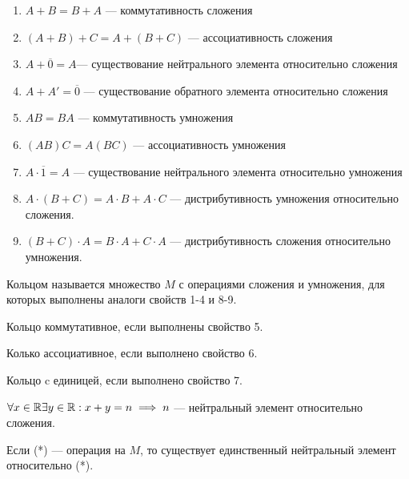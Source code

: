 \begin{normalsize}
\begin{enumerate}
    \item $A + B = B + A$ --- коммутативность сложения
    \item $(A + B) + C = A + (B + C)$ --- ассоциативность сложения
    \item $A + \overline{0} = A$--- существование нейтрального элемента относительно сложения
    \item $A + A' = \overline{0}$ --- существование обратного элемента относительно сложения
    \item $AB = BA$ --- коммутативность умножения
    \item $(AB)C = A(BC)$ --- ассоциативность умножения
    \item $A \cdot \overline{1} = A$ --- существование нейтрального элемента относительно умножения
    \item $A \cdot (B + C) = A \cdot B + A \cdot C$ --- дистрибутивность умножения относительно сложения.
    \item $(B + C) \cdot A = B \cdot A + C \cdot A$ --- дистрибутивность сложения относительно умножения.
\end{enumerate}

\begin{defn}
    Кольцом называется множество $M$ с операциями сложения и умножения, для которых выполнены аналоги свойств 1-4 и 8-9.
\end{defn}

\begin{defn}
    Кольцо коммутативное, если выполнены свойство 5.
\end{defn}

\begin{defn}
    Колько ассоциативное, если выполнено свойство 6.
\end{defn}

\begin{defn}
    Кольцо c единицей, если выполнено свойство 7.
\end{defn}

\begin{defn}
    $\forall x \in \mathbb{R} \exists y \in \mathbb{R}: x + y = n \implies n$ --- нейтральный элемент относительно сложения.
\end{defn}    

\begin{notice}
    Если (*) --- операция на $M$, то существует единственный нейтральный элемент относительно (*).
\end{notice}


\end{normalsize}
